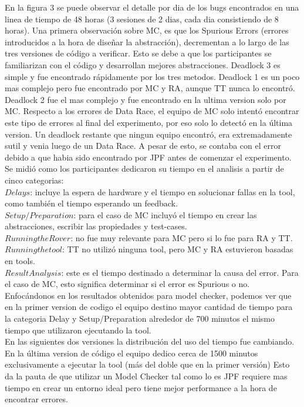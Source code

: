 \documentclass[runningheads]{llncs}
\begin{document}
En la figura 3 se puede observar el detalle por dia de los bugs encontrados en una linea de tiempo de 48 horas (3 sesiones de 2 dias, cada dia consistiendo de 8 horas). Una primera observaci\'on sobre MC, es que los Spurious Errors (errores introducidos a la hora de dise\~nar la abstracci\'on), decrementan a lo largo de las tres versiones de c\'odigo a verificar. Esto se debe a que los participantes se familiarizan con el c\'odigo y desarrollan mejores abstracciones. Deadlock 3 es simple y fue encontrado r\'apidamente por los tres metodos. Deadlock 1 es un poco mas complejo pero fue encontrado por MC y RA, aunque TT nunca lo encontr\'o. Deadlock 2 fue el mas complejo y fue encontrado en la ultima version solo por MC. Respecto a los errores de Data Race, el equipo de MC solo intent\'o encontrar este tipo de errores al final del experimento, por eso solo lo detect\'o en la \'ultima version. Un deadlock restante que ningun equipo encontr\'o, era extremadamente sutil y venia luego de un Data Race. A pesar de esto, se contaba con el error debido a que habia sido encontrado por JPF antes de comenzar el experimento.\\
Se midi\'o como los participantes dedicaron su tiempo en el analisis a partir de cinco categorias:\\
$Delays$: incluye la espera de hardware y el tiempo en solucionar fallas en la tool, como tambi\'en el tiempo esperando un feedback.\\
$Setup/Preparation$: para el caso de MC incluy\'o el tiempo en crear las abstracciones, escribir las propiedades y test-cases.\\
$Running the Rover$: no fue muy relevante para MC pero si lo fue para RA y TT.\\
$Running the tool$: TT no utiliz\'o ninguna tool, pero MC y RA estuvieron basadas en tools.\\
$Result Analysis$: este es el tiempo destinado a determinar la causa del error. Para el caso de MC, esto significa determinar si el error es Spurious o no.\\
Enfoc\'andonos en los resultados obtenidos para model checker, podemos ver que en la primer version de codigo el equipo destino mayor cantidad de tiempo para la categoria Delay y Setup/Preparation alrededor de 700 minutos el mismo tiempo que utilizaron ejecutando la tool.\\
En las siguientes dos versiones la distribuci\'on del uso del tiempo fue cambiando. En la \'ultima version de c\'odigo el equipo dedico cerca de 1500 minutos exclusivamente a ejecutar la tool (m\'as del doble que en la primer versi\'on)
Esto da la pauta de que utilizar un Model Checker tal como lo es JPF requiere mas tiempo en crear un entorno ideal pero tiene mejor performance a la hora de encontrar errores.
\end{document}
